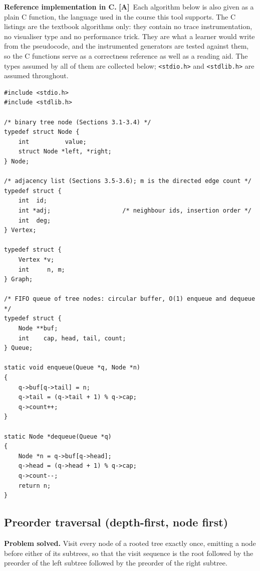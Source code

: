 \documentclass[11pt,a4paper]{article}
\newcommand{\A}{\textcolor{asmc}{\textbf{[A]}}}     %
\newcommand{\ct}[1]{\texttt{#1}}
\begin{document}
\smallskip
\noindent\textbf{Reference implementation in C.} \A\ Each algorithm below is also given as a plain C
function, the language used in the course this tool supports. The C listings are the textbook
algorithms only: they contain no trace instrumentation, no visualiser type and no performance
trick. They are what a learner would write from the pseudocode, and the instrumented generators are
tested against them, so the C functions serve as a correctness reference as well as a reading aid.
The types assumed by all of them are collected below; \ct{<stdio.h>} and \ct{<stdlib.h>} are
assumed throughout.

\begin{lstlisting}[style=c,caption={C types assumed by the listings in this section: a binary tree
node, a graph as an adjacency list, and the FIFO queue used by level-order.},label={lst:ctypes}]
#include <stdio.h>
#include <stdlib.h>

/* binary tree node (Sections 3.1-3.4) */
typedef struct Node {
    int          value;
    struct Node *left, *right;
} Node;

/* adjacency list (Sections 3.5-3.6); m is the directed edge count */
typedef struct {
    int  id;
    int *adj;                    /* neighbour ids, insertion order */
    int  deg;
} Vertex;

typedef struct {
    Vertex *v;
    int     n, m;
} Graph;

/* FIFO queue of tree nodes: circular buffer, O(1) enqueue and dequeue */
typedef struct {
    Node **buf;
    int    cap, head, tail, count;
} Queue;

static void enqueue(Queue *q, Node *n)
{
    q->buf[q->tail] = n;
    q->tail = (q->tail + 1) % q->cap;
    q->count++;
}

static Node *dequeue(Queue *q)
{
    Node *n = q->buf[q->head];
    q->head = (q->head + 1) % q->cap;
    q->count--;
    return n;
}
\end{lstlisting}

\subsection{Preorder traversal (depth-first, node first)}

\noindent\textbf{Problem solved.} Visit every node of a rooted tree exactly once, emitting a node
before either of its subtrees, so that the visit sequence is the root followed by the preorder of
the left subtree followed by the preorder of the right subtree.
\end{document}
